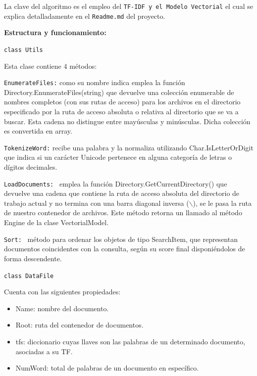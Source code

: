 \documentclass[a4paper, 12pt]{article}
\begin{document}
La clave del algoritmo es el empleo del {\tt TF-IDF y el Modelo Vectorial} el cual se explica detalladamente en el {\tt Readme.md} del proyecto.\\
\vspace{0.5cm}

\textbf{Estructura y funcionamiento:}
\vspace{0.5cm}

{\tt class Utils}
\vspace{0.5cm}

Esta clase contiene 4 métodos:
\vspace{0.5cm}

{\tt EnumerateFiles:} como su nombre indica emplea la función Directory.EnumerateFiles(string) que
devuelve una colección enumerable de nombres completos (con sus rutas de acceso) para
los archivos en el directorio especificado por la ruta de acceso absoluta o relativa
al directorio que se va a buscar. Esta cadena no distingue entre mayúsculas y minúsculas.
Dicha colección es convertida en array.


    {\tt TokenizeWord:} recibe una palabra y la normaliza utilizando
Char.IsLetterOrDigit que indica si un carácter Unicode pertenece en alguna
categoría de letras o dígitos decimales.


    {\tt LoadDocuments: } emplea la función Directory.GetCurrentDirectory() que
devuelve una cadena que contiene la ruta de acceso absoluta del directorio
de trabajo actual y no termina con una barra diagonal inversa ($\backslash$), se le pasa
la ruta de nuestro contenedor de archivos. Este método retorna un llamado
al método Engine de la clase VectorialModel.


    {\tt Sort: } método para ordenar los objetos de tipo SearchItem, que representan
documentos coincidentes con la consulta, según su score final
disponiéndolos de forma descendente.
\vspace{0.5cm}

{\tt class DataFile}
\vspace{0.5cm}

Cuenta con las siguientes propiedades:
\begin{itemize}
    \item Name: nombre del documento.
    \item Root: ruta del contenedor de documentos.
    \item tfs: diccionario cuyas llaves son las palabras de un determinado documento, asociadas a su TF.
    \item NumWord: total de palabras de un documento en específico.
\end{itemize}
\end{document}
